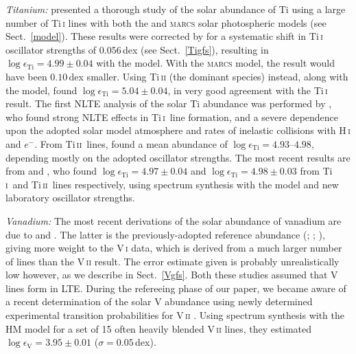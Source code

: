 \documentclass[traditabstract]{aa}
\newcommand{\alttii}{Ti\,\textsc{i}}
\newcommand{\alttiii}{Ti\,\textsc{ii}}
\newcommand{\tii}{\alttii\ }
\newcommand{\tiii}{\alttiii\ }
\begin{document}
\textit{Titanium:} \citet{Blackwell87} presented a thorough study of the solar abundance of Ti using a large number of
Ti\,\textsc{i} lines with both the  and \textsc{marcs} \citep{MARCS75} solar photospheric models (see Sect.~\ref{model}).
These results were corrected by \citet{Grevesse89} for a systematic shift in Ti\,\textsc{i} oscillator strengths
of $0.056$\,dex (see Sect.~\ref{Tigfs}), resulting in $\log \epsilon_\mathrm{Ti}=4.99\pm0.04$ with the 
 model.  With the \textsc{marcs} model, the result would have been $0.10$\,dex smaller.  Using Ti\,\textsc{ii}
 (the dominant species) instead, along with the  model, \citet{Bizzarri93} found
 $\log \epsilon_\mathrm{Ti}=5.04\pm0.04$, in very good agreement with the Ti\,\textsc{i} result.  The first NLTE analysis of the solar Ti abundance was performed by \citet{Bergemann11}, who found strong NLTE effects in \tii line formation, and 
a severe dependence upon the adopted solar model atmosphere and rates of inelastic collisions with H\,\textsc{i} and $e^{-}$.  From \tiii lines, \citet{Bergemann11} found a mean abundance of $\log \epsilon_\mathrm{Ti}=4.93$--$4.98$, depending mostly on the adopted oscillator strengths.  The most recent results are from \citet{Lawler13} and \citet{Wood13}, who found $\log \epsilon_\mathrm{Ti}=4.97\pm0.04$ and $\log \epsilon_\mathrm{Ti}=4.98\pm0.03$ from \tii and \tiii lines respectively, using spectrum synthesis with the  model and new laboratory oscillator strengths.

\textit{Vanadium:} The most recent derivations of the solar abundance of vanadium are due to \citet[][ with
V\,\textsc{i} and the  model: $\log \epsilon_\mathrm{V}=3.99\pm0.01$]{Whaling85} and \citet[][ with
V\,\textsc{i}, V\,\textsc{ii} and the  model: $\log
\epsilon_\mathrm{V}=4.00\pm0.02$]{Biemont89}.  The latter is the
previously-adopted reference abundance (; ;
\citealt{Grevesse07}), giving more weight to the V\,\textsc{i} data,
which is derived from a much larger number of lines than the
V\,\textsc{ii} result.  The error estimate given is probably
unrealistically low however, as we describe in Sect.~\ref{Vgfs}.  Both these studies assumed that V lines form in LTE.
During the refereeing phase of our paper, we became aware of a recent determination of the solar V abundance using newly determined experimental transition probabilities for V\,\textsc{ii} \citep{Wood14V2}. Using spectrum synthesis with the HM model for a set of 15 often heavily blended V\,\textsc{ii} lines, they estimated $\log \epsilon_\mathrm{V}=3.95\pm0.01$ ($\sigma=0.05$\,dex). 
\end{document}
